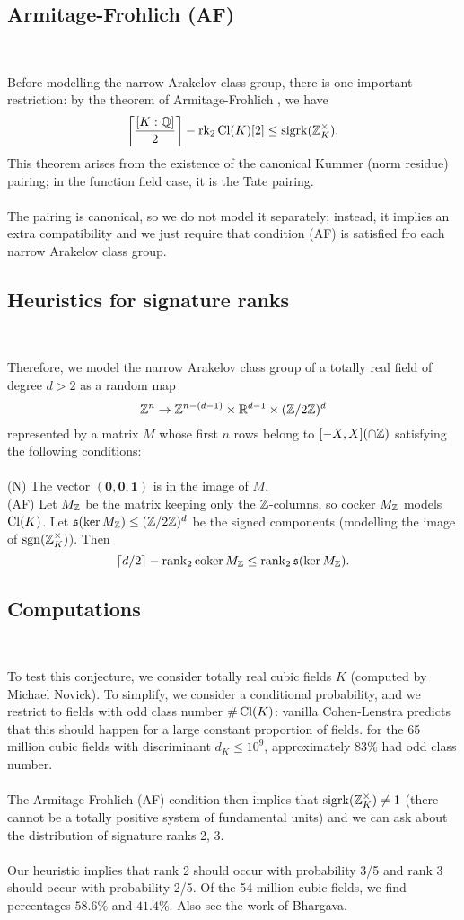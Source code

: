 \documentclass[12pt,amsfont]{amsart}
\begin{document}
\subsection{Armitage-Frohlich (AF)}
{\ }

Before modelling the narrow Arakelov class group, there is one important restriction: by the theorem of Armitage-Frohlich , we have
\[ \left \lceil \frac{[K : {\mathbb Q}]}{2} \right \rceil - \text{rk}_2 \operatorname{Cl}(K)[2] \leq \operatorname{sigrk}({\mathbb Z}_K^\times). \]
This theorem arises from the existence of the canonical Kummer (norm residue) pairing; in the function field case, it is the Tate pairing. \\ \\
The pairing is canonical, so we do not model it separately; instead, it implies an extra compatibility and we just require that condition (AF) is satisfied fro each narrow Arakelov class group.

 
\subsection{Heuristics for signature ranks}
{\ }

Therefore, we model the narrow Arakelov class group of a totally real field of degree $d > 2$ as a random map
\[ {\mathbb Z}^n \rightarrow {\mathbb Z}^{n-(d-1)} \times {\mathbb R}^{d-1} \times ({\mathbb Z} / 2 {\mathbb Z})^d \]
represented by a matrix $M$ whose first $n$ rows belong to $[-X, X] (\cap {\mathbb Z})$ satisfying the following conditions: \\ \\
(N) The vector $(\textbf{0}, \textbf{0}, \textbf{1})$ is in the image of $M$. \\ 
(AF) Let $M_{\mathbb Z}$ be the matrix keeping only the ${\mathbb Z}$-columns, so cocker $M_{\mathbb Z}$ models $\operatorname{Cl}(K)$. Let $\mathfrak{s}(\ker M_{\mathbb Z}) \leq ({\mathbb Z}/2{\mathbb Z})^d$ be the signed components (modelling the image of $\operatorname{sgn}({\mathbb Z}_K^\times)$). Then
\[ \lceil d/2 \rceil - \operatorname{rank}_2 \operatorname{coker} M_{\mathbb Z} \leq \operatorname{rank}_2 \mathfrak{s}(\ker M_{\mathbb Z}).\]


\subsection{Computations}
{\ }

To test this conjecture, we consider totally real cubic fields $K$ (computed by Michael Novick). To simplify, we consider a conditional probability, and we restrict to fields with odd class number $\# \operatorname{Cl}(K)$: vanilla Cohen-Lenstra predicts that this should happen for a large constant proportion of fields. for the 65 million cubic fields with discriminant $d_K \leq 10^9$, approximately 83$\%$ had odd class number. \\ \\
The Armitage-Frohlich (AF) condition then implies that $\operatorname{sigrk}({\mathbb Z}_K^\times) \ne 1$ (there cannot be a  totally positive system of fundamental units) and we can ask about the distribution of signature ranks 2, 3. \\ \\
Our heuristic implies that rank 2 should occur with probability 3/5 and rank 3 should occur with probability 2/5. Of the 54 million cubic fields, we find percentages $58.6\%$ and $41.4\%$. Also see the work of Bhargava. 
\end{document}
